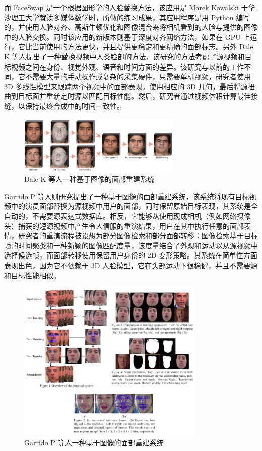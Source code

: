 而 FaceSwap \cite{list1107} 是一个根据图形学的人脸替换方法，该应用是 Marek Kowalski 于华沙理工大学就读多媒体数学时，所做的练习成果，其应用程序是用 Python 编写的，并使用人脸对齐、高斯牛顿优化和图像混合来将相机看到的人脸与提供的图像中的人脸交换。同时该应用的新版本则基于深度对齐网络方法，如果在 GPU 上运行，它比当前使用的方法更快，并且提供更稳定和更精确的面部标志。另外 Dale K 等人\cite{dale2011video}提出了一种替换视频中人类脸部的方法，该研究的方法考虑了源视频和目标视频之间在身份、视觉外观、语音和时间方面的差异。该研究与以前的工作不同，它不需要大量的手动操作或复杂的采集硬件，只需要单机视频，研究者使用 3D 多线性模型来跟踪两个视频中的面部表现，使用相应的 3D 几何，最后将源扭曲到目标面并重新定时源以匹配目标性能。然后，研究者通过视频体积计算最佳接缝，以保持最终合成中的时间一致性。

\begin{figure}[htb]
\centering 
\includegraphics[width=0.70\textwidth]{img/ch1m3.png} 
\caption{Dale K 等人一种基于图像的面部重建系统}
\label{Test}
\end{figure}

Garrido P \cite{garrido2014automatic} 等人则研究提出了一种基于图像的面部重建系统，该系统将现有目标视频中的演员面部替换为源视频中用户的面部，同时保留原始目标表现，其系统是全自动的，不需要源表达式数据库。相反，它能够从使用现成相机（例如网络摄像头）捕获的短源视频中产生令人信服的重演结果，用户在其中执行任意的面部表情，研究者的重演流程被设想为部分图像检索和部分面部转移：图像检索基于目标帧的时间聚类和一种新颖的图像匹配度量，该度量结合了外观和运动以从源视频中选择候选帧，而面部转移使用保留用户身份的 2D 变形策略。其系统在简单性方面表现出色，因为它不依赖于 3D 人脸模型，它在头部运动下很稳健，并且不需要源和目标性能相似。

\begin{figure}[htb]
\centering 
\includegraphics[width=0.80\textwidth]{img/ch1m4.png} 
\caption{Garrido P 等人一种基于图像的面部重建系统}
\label{Test}
\end{figure}

